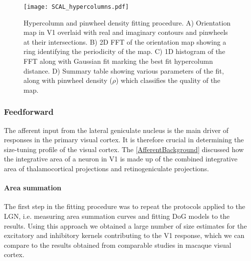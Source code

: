 \begin{figure}
	\centering
        \texttt{[image: SCAL\_hypercolumns.pdf]}
	\caption[Hypercolumn and pinwheel density fitting procedure and
      results.]{Hypercolumn and pinwheel density fitting procedure. A)
      Orientation map in V1 overlaid with real and imaginary contours
      and pinwheels at their intersections. B) 2D FFT of the
      orientation map showing a ring identifying the periodicity of
      the map. C) 1D histogram of the FFT along with Gaussian fit
      marking the best fit hypercolumn distance. D) Summary table
      showing various parameters of the fit, along with pinwheel
      density ($\rho$) which classifies the quality of the map.}
	\label{SCALhypercolumns}
\end{figure}

\subsubsection{Feedforward}

The afferent input from the lateral geniculate nucleus is the main
driver of responses in the primary visual cortex. It is therefore
crucial in determining the size-tuning profile of the visual cortex.
The \ref{AfferentBackground} discussed how the integrative area of a
neuron in V1 is made up of the combined integrative area of
thalamocortical projections and retinogeniculate projections.

\paragraph{Area summation}

The first step in the fitting procedure was to repeat the protocols
applied to the LGN, i.e. measuring area summation curves and fitting
DoG models to the results. Using this approach we obtained a large
number of size estimates for the excitatory and inhibitory kernels
contributing to the V1 response, which we can compare to the results
obtained from comparable studies in macaque visual cortex.


